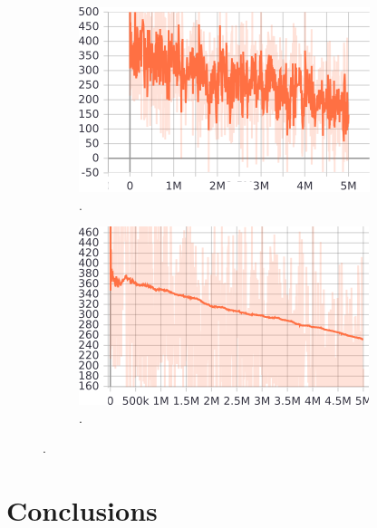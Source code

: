 \documentclass[11pt, a4paper]{article}
\begin{document}
\begin{figure}[h]
	\begin{subfigure}{0.45\textwidth}
		\centering
		\includegraphics[width=\linewidth]{loss_notSmoothed.png}  
		\caption{.}
	\end{subfigure}
	\begin{subfigure}{0.45\textwidth}
		\centering
		\includegraphics[width=\linewidth]{loss_smoothed.png}  
		\caption{.}
	\end{subfigure}
	\caption{\label{fig:loss_tb}.}
\end{figure}

\section{Conclusions}


\clearpage
{}

\end{document}
